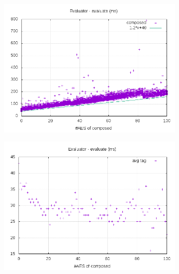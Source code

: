 \documentclass[10pt,a4paper]{article}
\begin{document}
\begin{figure}[h]
    \begin{subfigure}[t]{0.3\textwidth}
        \includegraphics[width=\textwidth]{eval_eval_plots}
        \caption{}
        \label{data eval eval composed}
    \end{subfigure}
    \begin{subfigure}[t]{0.3\textwidth}
        \includegraphics[width=\textwidth]{eval_eval_avg}
        \caption{}
        \label{data eval eval tag}
    \end{subfigure}
    \begin{subfigure}[t]{0.3\textwidth}

\end{subfigure}
\end{figure}
\end{document}
